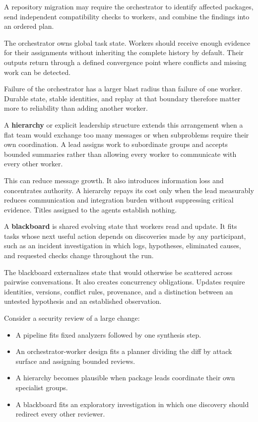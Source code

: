 A repository migration may require the orchestrator to identify affected packages, send independent compatibility checks to workers, and combine the findings into an ordered plan.

The orchestrator owns global task state. Workers should receive enough evidence for their assignments without inheriting the complete history by default. Their outputs return through a defined convergence point where conflicts and missing work can be detected.

Failure of the orchestrator has a larger blast radius than failure of one worker. Durable state, stable identities, and replay at that boundary therefore matter more to reliability than adding another worker.

A \textbf{hierarchy} or explicit leadership structure extends this arrangement when a flat team would exchange too many messages or when subproblems require their own coordination. A lead assigns work to subordinate groups and accepts bounded summaries rather than allowing every worker to communicate with every other worker.

This can reduce message growth. It also introduces information loss and concentrates authority. A hierarchy repays its cost only when the lead measurably reduces communication and integration burden without suppressing critical evidence. Titles assigned to the agents establish nothing.

A \textbf{blackboard} is shared evolving state that workers read and update. It fits tasks whose next useful action depends on discoveries made by any participant, such as an incident investigation in which logs, hypotheses, eliminated causes, and requested checks change throughout the run.

The blackboard externalizes state that would otherwise be scattered across pairwise conversations. It also creates concurrency obligations. Updates require identities, versions, conflict rules, provenance, and a distinction between an untested hypothesis and an established observation.


Consider a security review of a large change:

\begin{itemize}
\tightlist
\item
  A pipeline fits fixed analyzers followed by one synthesis step.
\item
  An orchestrator-worker design fits a planner dividing the diff by attack surface and assigning bounded reviews.
\item
  A hierarchy becomes plausible when package leads coordinate their own specialist groups.
\item
  A blackboard fits an exploratory investigation in which one discovery should redirect every other reviewer.
\end{itemize}

